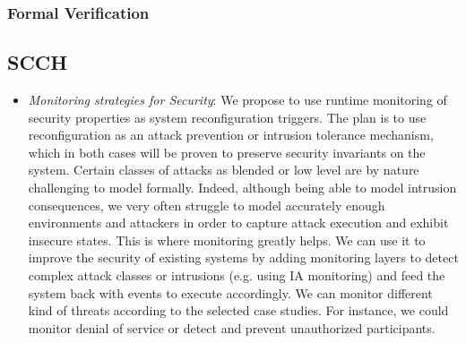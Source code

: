 \documentclass[a4paper,11pt]{article}
\begin{document}
\subsubsection{Formal Verification}

\subsection{SCCH}
\begin{itemize}
\item \emph{Monitoring strategies for Security}: We propose to use runtime monitoring of security properties as system reconfiguration triggers. The plan is to use reconfiguration as an attack prevention or intrusion tolerance mechanism, which in both cases will be proven to preserve security invariants on the system. Certain classes of attacks as blended or low level are by nature challenging to model formally. Indeed, although being able to model intrusion consequences, we very often struggle to model accurately enough environments and attackers in order to capture attack execution and exhibit insecure states. This is where monitoring greatly helps. We can use it to improve the security of existing systems by adding monitoring layers to detect complex attack classes or intrusions (e.g. using IA monitoring) and feed the system back with events to execute accordingly. We can monitor different kind of threats according to the selected case studies. For instance, we could monitor denial of service or detect and prevent unauthorized participants.


\end{itemize}
\end{document}
